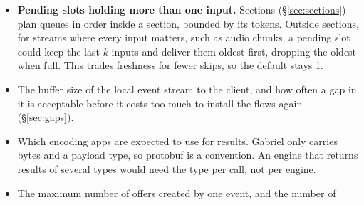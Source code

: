 \documentclass[11pt]{article}
\begin{document}
\begin{itemize}[nosep]
\begin{itemize}[nosep]
                often a result waits at a fan-out because no branch has a
                token, and what that costs F.
          \item Large inputs on a crossing. $Z$ counts the round trip, not
                the time to send the input's bytes; at low bandwidth, that
                time should be added from the bandwidth estimate.
          \item Branches that leave their server, to the client or over a
                crossing. Their completions are seen only by the client, so
                their pools would have to live there, at the cost of a round
                trip per gate.
          \item A slow network link as the bottleneck. $D_{\max}$ counts
                engines only; the crossing capacity limits the link, as
                today.
          \item Engines whose results the app reads, in the middle of a
                chain. Gating them also lowers how many results the app
                gets.
          \item Joins, once they exist. A join that needs results from
                both branches makes the fork-to-join region one section,
                whose branches take an input all together or not at all.
          \item Predictive pull, which would turn a count into a time.
        \end{itemize}
  \item \textbf{Pending slots holding more than one input.} Sections
        (\S\ref{sec:sections}) plan queues in order inside a section, bounded
        by its tokens. Outside sections, for streams where every input
        matters, such as audio chunks, a pending slot could keep the last $k$
        inputs and deliver them oldest first, dropping the oldest when full.
        This trades freshness for fewer skips, so the default stays 1.
  \item The buffer size of the local event stream to the client, and how
        often a gap in it is acceptable before it costs too much to install
        the flows again (\S\ref{sec:gaps}).
  \item Which encoding apps are expected to use for results. Gabriel only
        carries bytes and a payload type, so protobuf is a convention. An
        engine that returns results of several types would need the type per
        call, not per engine.
  \item The maximum number of offers created by one event, and the number of

\end{itemize}
\end{document}
